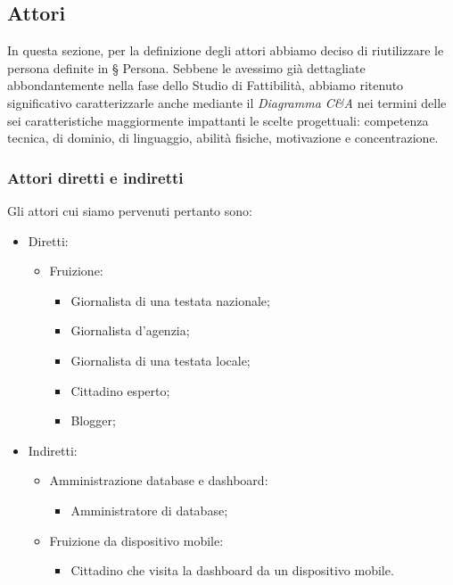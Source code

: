 \subsection{Attori}
In questa sezione, per la definizione degli attori abbiamo deciso di riutilizzare le persona definite in § Persona.
Sebbene le avessimo già dettagliate abbondantemente nella fase dello Studio di Fattibilità, abbiamo ritenuto significativo caratterizzarle anche mediante il \textit{Diagramma C\&A} nei termini delle sei caratteristiche maggiormente impattanti le scelte progettuali: competenza tecnica, di dominio, di linguaggio, abilità fisiche, motivazione e concentrazione.

\noindent
\subsubsection{Attori diretti e indiretti}
Gli attori cui siamo pervenuti pertanto sono:
\begin{itemize}
    \item Diretti:
    \begin{itemize}
        \item Fruizione:
        \begin{itemize}
            \item Giornalista di una testata nazionale;
            \item Giornalista d'agenzia;
            \item Giornalista di una testata locale;
            \item Cittadino esperto;
            \item Blogger;
        \end{itemize}
    \end{itemize}
    \item Indiretti:
    \begin{itemize}
        \item Amministrazione database e dashboard:
        \begin{itemize}
            \item Amministratore di database;
        \end{itemize}
        \item Fruizione da dispositivo mobile:
        \begin{itemize}
            \item Cittadino che visita la dashboard da un dispositivo mobile.
        \end{itemize}
    \end{itemize}
\end{itemize}

